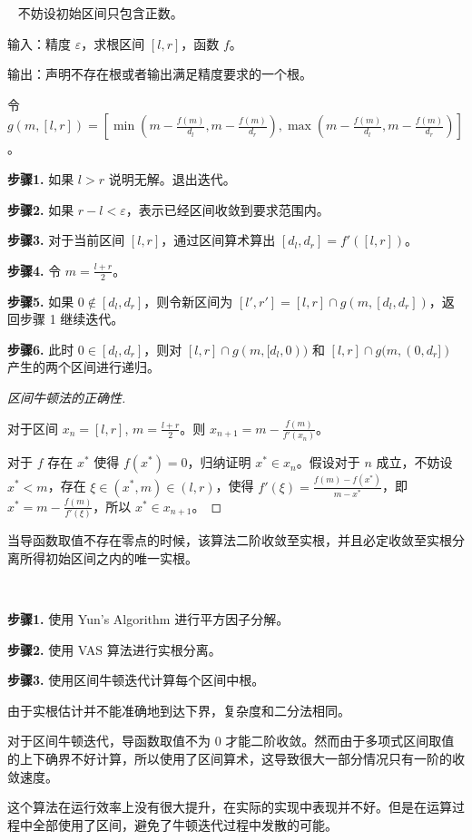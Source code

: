 \begin{algorithm}[区间牛顿法]~
	不妨设初始区间只包含正数。
	
	输入：精度 $\varepsilon$，求根区间 $[l, r]$，函数 $f$。
	
	输出：声明不存在根或者输出满足精度要求的一个根。
	
	令 $g(m, [l, r]) = [\min(m - \frac{f(m)}{d_l}, m - \frac{f(m)}{d_r}), \max(m - \frac{f(m)}{d_l}, m - \frac{f(m)}{d_r})]$。
	
	\textbf{步骤1.} 如果 $l > r$ 说明无解。退出迭代。
	
	\textbf{步骤2.} 如果 $r - l < \varepsilon$，表示已经区间收敛到要求范围内。
	
	\textbf{步骤3.} 对于当前区间 $[l, r]$，通过区间算术算出 $[d_l, d_r] = f'([l, r])$。
	
	\textbf{步骤4.} 令 $m = \frac{l + r}{2}$。
	
	\textbf{步骤5.} 如果 $0 \notin [d_l, d_r]$，则令新区间为 $[l', r'] = [l, r] \cap g(m, [d_l, d_r])$，返回步骤 1 继续迭代。
	
	\textbf{步骤6.} 此时 $0 \in [d_l, d_r]$，则对 $[l, r] \cap g(m, [d_l, 0))$ 和 $[l, r] \cap g(m, (0, d_r])$ 产生的两个区间进行递归。
	
\end{algorithm}

\begin{proof}[\newcontent 区间牛顿法的正确性]~

	对于区间 $x_n = [l, r]$, $m = \frac{l + r}{2}$。则 $x_{n + 1} = m - \frac{f(m)}{f'(x_n)}$。

	对于 $f$ 存在 $x^*$ 使得 $f(x^*) = 0$，归纳证明 $x^* \in x_n$。假设对于 $n$ 成立，不妨设 $x^* < m$，存在 $\xi \in (x^*, m) \in (l, r)$，使得 $f'(\xi) = \frac{f(m) - f(x^*)}{m - x^*}$，即 $x^* = m - \frac{f(m)}{f'(\xi)}$，所以 $x^* \in x_{n + 1}$。



\end{proof}

当导函数取值不存在零点的时候，该算法二阶收敛至实根，并且必定收敛至实根分离所得初始区间之内的唯一实根。

\begin{algorithm}~

	\textbf{步骤1.} 使用 Yun's Algorithm 进行平方因子分解。

	\textbf{步骤2.} 使用 VAS 算法进行实根分离。

	\textbf{步骤3.} 使用区间牛顿迭代计算每个区间中根。


\end{algorithm}

由于实根估计并不能准确地到达下界，复杂度和二分法相同。

对于区间牛顿迭代，导函数取值不为 $0$ 才能二阶收敛。然而由于多项式区间取值的上下确界不好计算，所以使用了区间算术，这导致很大一部分情况只有一阶的收敛速度。

这个算法在运行效率上没有很大提升，在实际的实现中表现并不好。但是在运算过程中全部使用了区间，避免了牛顿迭代过程中发散的可能。
